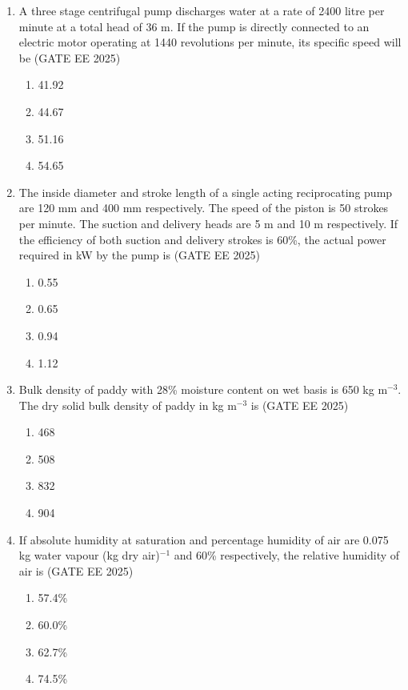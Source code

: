 \documentclass[journal,12pt,onecolumn]{IEEEtran}
\theoremstyle{remark}
\begin{document}
\begin{enumerate}
\item A three stage centrifugal pump discharges water at a rate of 2400 litre per minute at a total head of 36 m. If the pump is directly connected to an electric motor operating at 1440 revolutions per minute, its specific speed will be
\hfill(GATE EE 2025)
\begin{multicols}{4}
\begin{enumerate}
\item 41.92
\item 44.67
\item 51.16
\item 54.65
\end{enumerate}
\end{multicols}

\item The inside diameter and stroke length of a single acting reciprocating pump are 120 mm and 400 mm respectively. The speed of the piston is 50 strokes per minute. The suction and delivery heads are 5 m and 10 m respectively. If the efficiency of both suction and delivery strokes is 60\%, the actual power required in kW by the pump is
\hfill(GATE EE 2025)
\begin{multicols}{4}
\begin{enumerate}
\item 0.55
\item 0.65
\item 0.94
\item 1.12
\end{enumerate}
\end{multicols}

\item Bulk density of paddy with 28\% moisture content on wet basis is 650 kg m$^{-3}$. The dry solid bulk density of paddy in kg m$^{-3}$ is
\hfill(GATE EE 2025)
\begin{multicols}{4}
\begin{enumerate}
\item 468
\item 508
\item 832
\item 904
\end{enumerate}
\end{multicols}


\item If absolute humidity at saturation and percentage humidity of air are 0.075 kg water vapour (kg dry air)$^{-1}$ and 60\% respectively, the relative humidity of air is
\hfill(GATE EE 2025)
\begin{multicols}{4}
\begin{enumerate}
\item 57.4\%
\item 60.0\%
\item 62.7\%
\item 74.5\%
\end{enumerate}
\end{multicols}


\end{enumerate}
\end{document}
